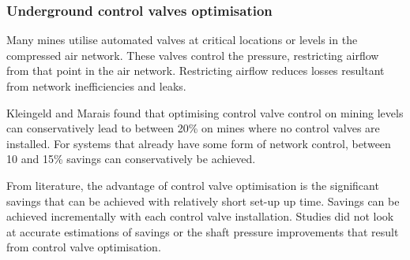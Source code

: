 		 \subsubsection{Underground control valves optimisation}
		 Many mines utilise automated valves at critical locations or levels in the compressed air network. These valves control the pressure, restricting airflow from that point in the air network. Restricting airflow reduces losses resultant from network inefficiencies and leaks.
		 \par 
		 Kleingeld and Marais \cite{kleingeld2010high} found that optimising control valve control on mining levels can conservatively lead to between 20\% on mines where no control valves are installed. For systems that already have some form of network control, between 10 and 15\% savings can conservatively be achieved.
		 \par 
		 From literature, the advantage of control valve optimisation is the significant savings that can be achieved with relatively short set-up up time. Savings can be achieved incrementally with each control valve installation. Studies did not look at accurate estimations of savings or the shaft pressure improvements that result from control valve optimisation.	 
